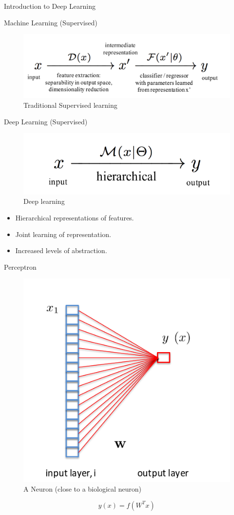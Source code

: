 ﻿\documentclass[table,aspectratio=43,mathserif,xcolor={usenames,dvipsnames,svgnames,table},10pt]{beamer}
\begin{document}
\begin{section}{Introduction to Deep Learning}
\end{section}

\begin{frame}{Machine Learning (Supervised)}
 \begin{figure}[h]
    \includegraphics[width=0.9\linewidth]{images/ml.png}  
    \caption{Traditional Supervised learning}
  \end{figure}
\end{frame}


\begin{frame}{Deep Learning (Supervised)}
 \begin{figure}[h]
    \includegraphics[width=0.9\linewidth]{images/dl.png}  
    \caption{Deep learning}
  \end{figure}
 \begin{itemize}
  \item<+-> Hierarchical representations of features.
  \item<+-> Joint learning of representation.
  \item<+-> Increased levels of abstraction.
 \end{itemize}
\end{frame}

\begin{frame}{Perceptron}
 \begin{figure}[h]
    \includegraphics[width=0.5\linewidth]{images/perceptron.png}  
    \caption{A Neuron (close to a biological neuron)}
  \end{figure}
  $$ y(x) = f( W^T x )$$
\end{frame}
\end{document}

